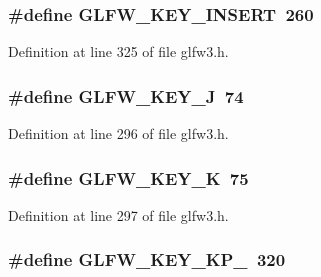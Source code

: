 \subsubsection[{G\+L\+F\+W\+\_\+\+K\+E\+Y\+\_\+\+I\+N\+S\+E\+R\+T}]{\setlength{\rightskip}{0pt plus 5cm}\#define G\+L\+F\+W\+\_\+\+K\+E\+Y\+\_\+\+I\+N\+S\+E\+R\+T~260}\label{group__keys_ga373ac7365435d6b0eb1068f470e34f47}


Definition at line 325 of file glfw3.\+h.

\hypertarget{group__keys_ga65ff2aedb129a3149ad9cb3e4159a75f}{}
\subsubsection[{G\+L\+F\+W\+\_\+\+K\+E\+Y\+\_\+\+J}]{\setlength{\rightskip}{0pt plus 5cm}\#define G\+L\+F\+W\+\_\+\+K\+E\+Y\+\_\+\+J~74}\label{group__keys_ga65ff2aedb129a3149ad9cb3e4159a75f}


Definition at line 296 of file glfw3.\+h.

\hypertarget{group__keys_ga4ae8debadf6d2a691badae0b53ea3ba0}{}
\subsubsection[{G\+L\+F\+W\+\_\+\+K\+E\+Y\+\_\+\+K}]{\setlength{\rightskip}{0pt plus 5cm}\#define G\+L\+F\+W\+\_\+\+K\+E\+Y\+\_\+\+K~75}\label{group__keys_ga4ae8debadf6d2a691badae0b53ea3ba0}


Definition at line 297 of file glfw3.\+h.

\hypertarget{group__keys_ga10515dafc55b71e7683f5b4fedd1c70d}{}
\subsubsection[{G\+L\+F\+W\+\_\+\+K\+E\+Y\+\_\+\+K\+P\+\_\+0}]{\setlength{\rightskip}{0pt plus 5cm}\#define G\+L\+F\+W\+\_\+\+K\+E\+Y\+\_\+\+K\+P\+\_~320}\label{group__keys_ga10515dafc55b71e7683f5b4fedd1c70d}


